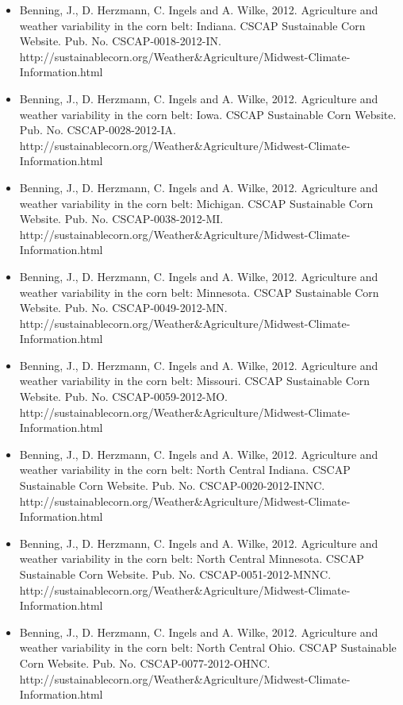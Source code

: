 \begin{itemize}
\item Benning, J., D. Herzmann, C. Ingels and A. Wilke, 2012. Agriculture and weather variability in the corn belt: Indiana. CSCAP Sustainable Corn Website. Pub. No. CSCAP-0018-2012-IN. http://sustainablecorn.org/Weather\&Agriculture/Midwest-Climate-Information.html

\item Benning, J., D. Herzmann, C. Ingels and A. Wilke, 2012. Agriculture and weather variability in the corn belt: Iowa. CSCAP Sustainable Corn Website. Pub. No. CSCAP-0028-2012-IA. http://sustainablecorn.org/Weather\&Agriculture/Midwest-Climate-Information.html

\item Benning, J., D. Herzmann, C. Ingels and A. Wilke, 2012. Agriculture and weather variability in the corn belt: Michigan. CSCAP Sustainable Corn Website. Pub. No. CSCAP-0038-2012-MI. http://sustainablecorn.org/Weather\&Agriculture/Midwest-Climate-Information.html

\item Benning, J., D. Herzmann, C. Ingels and A. Wilke, 2012. Agriculture and weather variability in the corn belt: Minnesota. CSCAP Sustainable Corn Website. Pub. No. CSCAP-0049-2012-MN. http://sustainablecorn.org/Weather\&Agriculture/Midwest-Climate-Information.html

\item Benning, J., D. Herzmann, C. Ingels and A. Wilke, 2012. Agriculture and weather variability in the corn belt: Missouri. CSCAP Sustainable Corn Website. Pub. No. CSCAP-0059-2012-MO. http://sustainablecorn.org/Weather\&Agriculture/Midwest-Climate-Information.html

\item Benning, J., D. Herzmann, C. Ingels and A. Wilke, 2012. Agriculture and weather variability in the corn belt: North Central Indiana. CSCAP Sustainable Corn Website. Pub. No. CSCAP-0020-2012-INNC. http://sustainablecorn.org/Weather\&Agriculture/Midwest-Climate-Information.html

\item Benning, J., D. Herzmann, C. Ingels and A. Wilke, 2012. Agriculture and weather variability in the corn belt: North Central Minnesota. CSCAP Sustainable Corn Website. Pub. No. CSCAP-0051-2012-MNNC. http://sustainablecorn.org/Weather\&Agriculture/Midwest-Climate-Information.html

\item Benning, J., D. Herzmann, C. Ingels and A. Wilke, 2012. Agriculture and weather variability in the corn belt: North Central Ohio. CSCAP Sustainable Corn Website. Pub. No. CSCAP-0077-2012-OHNC. http://sustainablecorn.org/Weather\&Agriculture/Midwest-Climate-Information.html


\end{itemize}
